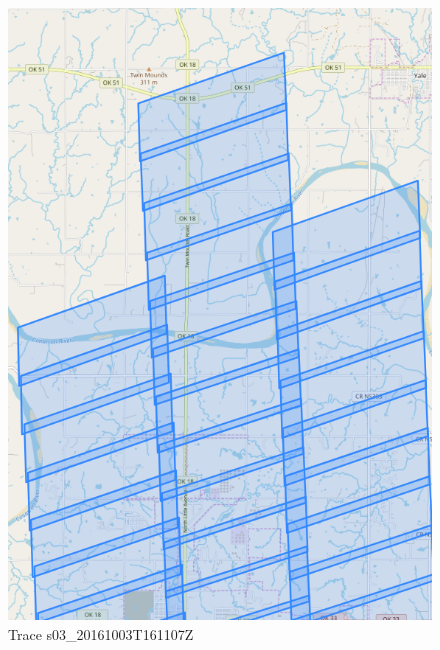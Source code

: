 \documentclass[paper=a4, fontsize=11pt, onecolumn, tikz, dvipsnames, svgnames, x11names]{article}
\begin{document}
\newpage
\begin{figure}
    \centering
    \includegraphics[height = 0.8\textheight]{trace_7Z.png}
    \caption{Trace s03\_20161003T161107Z}
    \label{fig_trace_7Z}
\end{figure}
\end{document}
